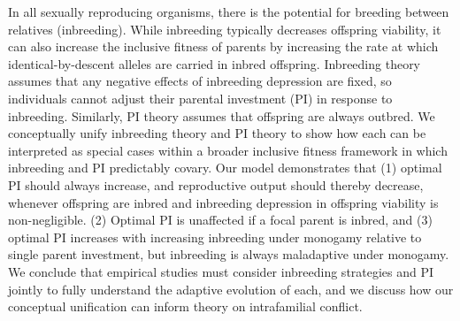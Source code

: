 \documentclass[12pt]{article}
\begin{document}
In all sexually reproducing organisms, there is the potential for breeding between relatives (inbreeding). While inbreeding typically decreases offspring viability, it can also increase the inclusive fitness of parents by increasing the rate at which identical-by-descent alleles are carried in inbred offspring. Inbreeding theory assumes that any negative effects of inbreeding depression are fixed, so individuals cannot adjust their parental investment (PI) in response to inbreeding. Similarly, PI theory assumes that offspring are always outbred. We conceptually unify inbreeding theory and PI theory to show how each can be interpreted as special cases within a broader inclusive fitness framework in which inbreeding and PI predictably covary. Our model demonstrates that (1) optimal PI should always increase, and reproductive output should thereby decrease, whenever offspring are inbred and inbreeding depression in offspring viability is non-negligible. (2) Optimal PI is unaffected if a focal parent is inbred, and (3) optimal PI increases with increasing inbreeding under monogamy relative to single parent investment, but inbreeding is always maladaptive under monogamy. We conclude that empirical studies must consider inbreeding strategies and PI jointly to fully understand the adaptive evolution of each, and we discuss how our conceptual unification can inform theory on intrafamilial conflict.
\end{document}
